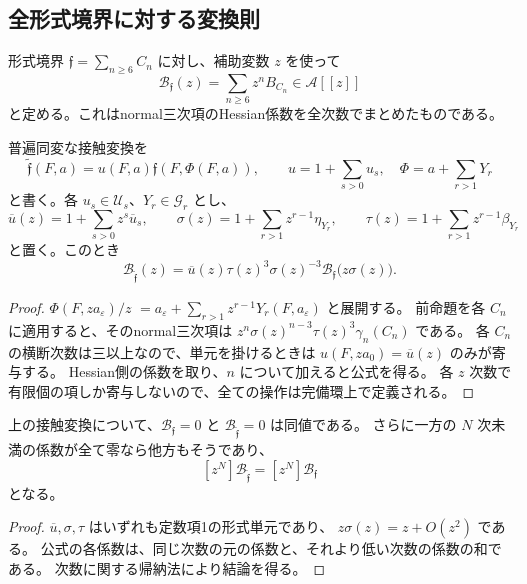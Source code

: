 \subsection{全形式境界に対する変換則}

形式境界 $\mathfrak f=\sum_{n\ge6}C_n$ に対し、補助変数 $z$ を使って
\[
 \mathcal B_{\mathfrak f}(z)=\sum_{n\ge6}z^nB_{C_n}\in\mathcal A[[z]]
\]
と定める。これはnormal三次項のHessian係数を全次数でまとめたものである。

\begin{theorem}[normal係数の接触変換則]
\label{thm:v18-normal-contact-law}
普遍同変な接触変換を
\[
 \widetilde{\mathfrak f}(F,a)
   =u(F,a)\mathfrak f(F,\Phi(F,a)),\qquad
 u=1+\sum_{s>0}u_s,\quad
 \Phi=a+\sum_{r>1}Y_r
\]
と書く。各 $u_s\in\mathcal U_s$、$Y_r\in\mathcal G_r$ とし、
\[
 \overline u(z)=1+\sum_{s>0}z^s\overline u_s,
 \qquad
 \sigma(z)=1+\sum_{r>1}z^{r-1}\eta_{Y_r},
 \qquad
 \tau(z)=1+\sum_{r>1}z^{r-1}\beta_{Y_r}
\]
と置く。このとき
\begin{equation}\label{eq:v18-normal-contact-law}
 \boxed{\displaystyle
 \mathcal B_{\widetilde{\mathfrak f}}(z)
 =\overline u(z)\tau(z)^3\sigma(z)^{-3}
      \mathcal B_{\mathfrak f}\bigl(z\sigma(z)\bigr).}
\end{equation}
\end{theorem}

\begin{proof}
$\Phi(F,z a_\varepsilon)/z$
$=a_\varepsilon+\sum_{r>1}z^{r-1}Y_r(F,a_\varepsilon)$ と展開する。
前命題を各 $C_n$ に適用すると、そのnormal三次項は
$z^n\sigma(z)^{n-3}\tau(z)^3\gamma_n(C_n)$ である。
各 $C_n$ の横断次数は三以上なので、単元を掛けるときは
$u(F,z a_0)=\overline u(z)$ のみが寄与する。
Hessian側の係数を取り、$n$ について加えると公式を得る。
各 $z$ 次数で有限個の項しか寄与しないので、全ての操作は完備環上で定義される。
\end{proof}

\begin{corollary}[最初の非零normal係数は接触不変である]
\label{cor:v18-first-normal-contact-invariant}
上の接触変換について、$\mathcal B_{\mathfrak f}=0$ と
$\mathcal B_{\widetilde{\mathfrak f}}=0$ は同値である。
さらに一方の $N$ 次未満の係数が全て零なら他方もそうであり、
\[
 [z^N]\mathcal B_{\widetilde{\mathfrak f}}
 =[z^N]\mathcal B_{\mathfrak f}
\]
となる。
\end{corollary}

\begin{proof}
$\overline u,\sigma,\tau$ はいずれも定数項1の形式単元であり、
$z\sigma(z)=z+O(z^2)$ である。
公式の各係数は、同じ次数の元の係数と、それより低い次数の係数の和である。
次数に関する帰納法により結論を得る。
\end{proof}

